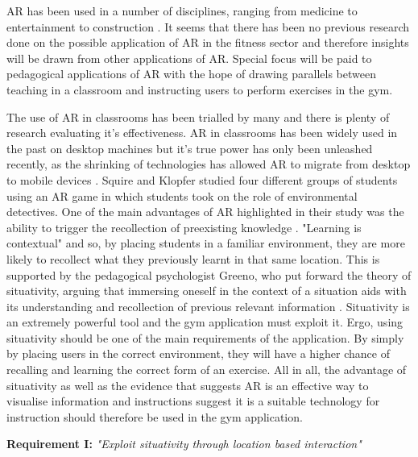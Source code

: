 \documentclass{l4proj}
\begin{document}
AR has been used in a number of disciplines, ranging from medicine to entertainment to construction \cite{azuma_recent_2001}. It seems that there has been no previous research done on the possible application of AR in the fitness sector and therefore insights will be drawn from other applications of AR. Special focus will be paid to pedagogical applications of AR with the hope of drawing parallels between teaching in a classroom and instructing users to perform exercises in the gym. 

The use of AR in classrooms has been trialled by many and there is plenty of research evaluating it's effectiveness. AR in classrooms has been widely used in the past on desktop machines \cite{iordache_comparison_2009} but it's true power has only been unleashed recently, as the shrinking of technologies has allowed AR to migrate from desktop to mobile devices \cite{squire_augmented_2007}. Squire and Klopfer studied four different groups of students using an AR game in which students took on the role of environmental detectives. One of the main advantages of AR highlighted in their study was the ability to trigger the recollection of preexisting knowledge \cite{squire_augmented_2007}. "Learning is contextual" \cite{liestol_learning_2011} and so, by placing students in a familiar environment, they are more likely to recollect what they previously learnt in that same location. This is supported by the pedagogical psychologist Greeno, who put forward the theory of situativity, arguing that immersing oneself in the context of a situation aids with its understanding and recollection of previous relevant information \cite{greeno_situativity_1998}. Situativity is an extremely powerful tool and the gym application must exploit it. Ergo, using situativity should be one of the main requirements of the application. By simply by placing users in the correct environment, they will have a higher chance of recalling and learning the correct form of an exercise. All in all, the advantage of situativity as well as the evidence that suggests AR is an effective way to visualise information and instructions \cite{squire_augmented_2007} suggest it is a suitable technology for instruction should therefore be used in the gym application.

\textbf{Requirement I:} \textit{"Exploit situativity through location based interaction"} \label{requirement_I}
\end{document}
